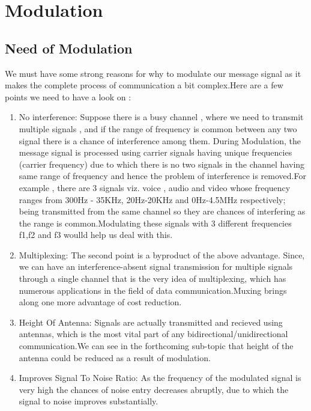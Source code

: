 \documentclass[12pt,a4paper]{article}%
\begin{document}
	\section{Modulation}
	\begin{flushleft}
		\subsection{Need of Modulation}
		\begin{flushleft}
			\fontsize{12pt}{18pt}\selectfont
			We must have some strong reasons for why to modulate our message signal as it makes the complete process of communication a bit complex.Here are a few points we need to have a look on :
			\begin{enumerate}
				\item {\large No interference: } Suppose there is a busy channel , where we need to transmit multiple signals , and if the range of frequency is common between any two signal there is a chance of interference among them. During Modulation, the message signal is processed using carrier signals having unique frequencies (carrier frequency) due to which there is no two signals in the channel having same range of frequency and hence the problem of interference is removed.For example , there are 3 signals viz. voice , audio and video whose frequency ranges from 300Hz - 35KHz, 20Hz-20KHz and  0Hz-4.5MHz respectively; being transmitted from the same channel so they are chances of interfering as the range is common.Modulating these signals with 3 different frequencies f1,f2 and f3 woulld help us deal with this.
				
				\item {\large Multiplexing: }The second point is a byproduct of the above advantage. Since, we can have an interference-absent signal transmission for multiple signals through a single channel that is the very idea of multiplexing, which has numerous applications in the field of data communication.Muxing brings along one more advantage of cost reduction.
				
				\item {\large Height Of Antenna: } Signals are actually transmitted and recieved using antennas, which is the most vital part of any bidirectional/unidirectional communication.We can see in the forthcoming sub-topic that height of the antenna could be reduced as a result of modulation.
				
				\item{\large Improves Signal To Noise Ratio: }As the frequency of the modulated signal is very high the chances of noise entry decreases abruptly, due to which the signal to noise improves substantially.
				

\end{enumerate}
\end{flushleft}
\end{flushleft}
\end{document}

